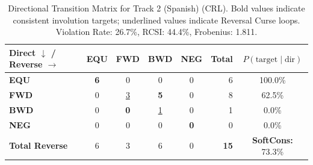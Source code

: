 \begin{table}[ht]
\centering
\small
\begin{tabular}{l|cccc|r|c}
\toprule
\textbf{Direct $\downarrow$ / Reverse $\rightarrow$} & \textbf{EQU} & \textbf{FWD} & \textbf{BWD} & \textbf{NEG} & \textbf{Total} & \textbf{$P(\text{target} \mid \text{dir})$} \\
\midrule
\textbf{EQU} & \textbf{6} & 0 & 0 & 0 & 6 & 100.0\% \\
\textbf{FWD} & 0 & \underline{3} & \textbf{5} & 0 & 8 & 62.5\% \\
\textbf{BWD} & 0 & \textbf{0} & \underline{1} & 0 & 1 & 0.0\% \\
\textbf{NEG} & 0 & 0 & 0 & \textbf{0} & 0 & 0.0\% \\
\midrule
\textbf{Total Reverse} & 6 & 3 & 6 & 0 & \textbf{15} & \textbf{SoftCons:} 73.3\% \\
\bottomrule
\end{tabular}
\caption{Directional Transition Matrix for Track 2 (Spanish) (CRL). Bold values indicate consistent involution targets; underlined values indicate Reversal Curse loops. Violation Rate: 26.7\%, RCSI: 44.4\%, Frobenius: 1.811.}
\label{tab:transition_matrix}
\end{table}